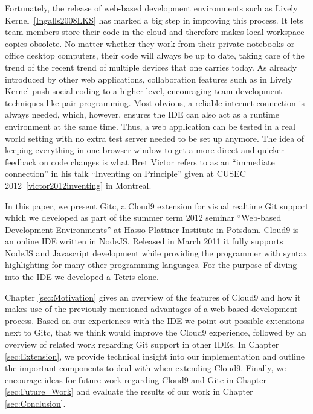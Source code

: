 Fortunately, the release of web-based development environments such as Lively Kernel~\ref{Ingalls2008LKS}
has marked a big step in improving this process.
It lets team members store their code in the cloud and therefore makes local workspace copies obsolete.
No matter whether they work from their private notebooks or office desktop computers, their code will always be up to date,
taking care of the trend of the recent trend of multiple devices that one carries today.
As already introduced by other web applications, collaboration features such as in Lively Kernel push social coding
to a higher level, encouraging team development techniques like pair programming.
Most obvious, a reliable internet connection is always needed, which, however, ensures the IDE can also act as a runtime environment at the same time.
Thus, a web application can be tested in a real world setting with no extra test server needed to be set up anymore.
The idea of keeping everything in one browser window to get a more direct and quicker feedback on code changes is
what Bret Victor refers to as an ``immediate connection'' in his talk ``Inventing on Principle'' given at
CUSEC 2012~\ref{victor2012inventing} in Montreal.

In this paper, we present Gitc, a Cloud9 extension for visual realtime Git support which we developed as part of the
summer term 2012 seminar ``Web-based Development Environments'' at Hasso-Plattner-Institute in Potsdam.
Cloud9 is an online IDE written in NodeJS. Released in March 2011 it fully supports NodeJS and Javascript development
while providing the programmer with syntax highlighting for many other programming languages.
For the purpose of diving into the IDE we developed a Tetris clone.


Chapter \ref{sec:Motivation} gives an overview of the features of Cloud9 and how it makes use of the
previously mentioned advantages of a web-based development process.
Based on our experiences with the IDE we point out possible extensions next to Gitc, that we think would improve
the Cloud9 experience, followed by an overview of related work regarding Git support in other IDEs.
In Chapter \ref{sec:Extension}, we provide technical insight into our implementation and outline the important
components to deal with when extending Cloud9.
Finally, we encourage ideas for future work regarding Cloud9 and Gitc in Chapter \ref{sec:Future_Work} and
evaluate the results of our work in Chapter \ref{sec:Conclusion}.